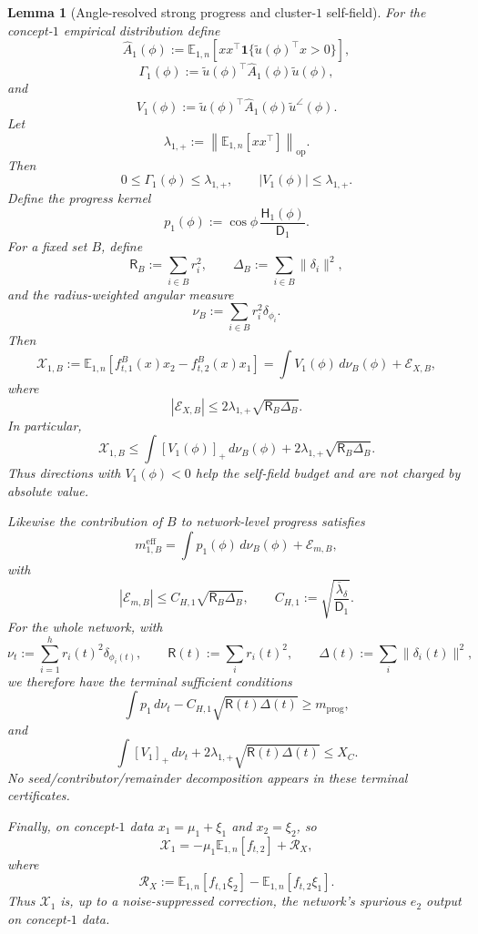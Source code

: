 \documentclass{article} %
\theoremstyle{plain}
\newtheorem{lemma}[theorem]{Lemma}
\theoremstyle{definition}
\theoremstyle{remark}
\begin{document}
\begin{lemma}[Angle-resolved strong progress and cluster-$1$ self-field]
\label{lem:angle-resolved-progress-self-field}
For the concept-$1$ empirical distribution define
\[
\widehat A_1(\phi)
:=
\mathbb E_{1,n}
\left[
xx^\top
\mathbf 1\{
\widetilde u(\phi)^\top x>0
\}
\right],
\]
\[
\Gamma_1(\phi)
:=
\widetilde u(\phi)^\top\widehat A_1(\phi)\widetilde u(\phi),
\]
and
\[
\boxed{
V_1(\phi)
:=
\widetilde u(\phi)^\top
\widehat A_1(\phi)
\widetilde u^\angle(\phi).
}
\]
Let
\[
\lambda_{1,+}
:=
\left\|
\mathbb E_{1,n}[xx^\top]
\right\|_{\mathrm{op}}.
\]
Then
\[
0\le\Gamma_1(\phi)\le\lambda_{1,+},
\qquad
|V_1(\phi)|\le\lambda_{1,+}.
\]
Define the progress kernel
\[
\boxed{
p_1(\phi)
:=
\cos\phi\,
\frac{\mathsf H_1(\phi)}{\mathsf D_1}.
}
\]
For a fixed set $B$, define
\[
\mathsf R_B:=\sum_{i\in B}r_i^2,
\qquad
\Delta_B:=\sum_{i\in B}\|\delta_i\|^2,
\]
and the radius-weighted angular measure
\[
\boxed{
\nu_B
:=
\sum_{i\in B}r_i^2\delta_{\phi_i}.
}
\]
Then
\[
\boxed{
\mathcal X_{1,B}
:=
\mathbb E_{1,n}
\left[
f_{t,1}^{B}(x)x_2-f_{t,2}^{B}(x)x_1
\right]
=
\int V_1(\phi)\,d\nu_B(\phi)
+
\mathcal E_{X,B},
}
\tag{X-measure}\label{eq:X-measure}
\]
where
\[
\boxed{
|\mathcal E_{X,B}|
\le
2\lambda_{1,+}
\sqrt{\mathsf R_B\Delta_B}.
}
\tag{X-measure-error}
\]
In particular,
\[
\boxed{
\mathcal X_{1,B}
\le
\int[V_1(\phi)]_+\,d\nu_B(\phi)
+
2\lambda_{1,+}\sqrt{\mathsf R_B\Delta_B}.
}
\tag{X-one-sided-measure}\label{eq:X-one-sided-measure}
\]
Thus directions with $V_1(\phi)<0$ help the self-field budget and are not
charged by absolute value.

Likewise the contribution of $B$ to network-level progress satisfies
\[
\boxed{
m_{1,B}^{\mathrm{eff}}
=
\int p_1(\phi)\,d\nu_B(\phi)
+
\mathcal E_{m,B},
}
\tag{m-measure}
\]
with
\[
\boxed{
|\mathcal E_{m,B}|
\le
C_{H,1}\sqrt{\mathsf R_B\Delta_B},
\qquad
C_{H,1}
:=
\sqrt{
\frac{\overline\lambda_\delta}{\mathsf D_1}
}.
}
\tag{m-measure-error}\label{eq:m-measure-error}
\]
For the whole network, with
\[
\nu_t:=\sum_{i=1}^h r_i(t)^2\delta_{\phi_i(t)},
\qquad
\mathsf R(t):=\sum_i r_i(t)^2,
\qquad
\Delta(t):=\sum_i\|\delta_i(t)\|^2,
\]
we therefore have the terminal sufficient conditions
\[
\boxed{
\int p_1\,d\nu_t
-
C_{H,1}\sqrt{\mathsf R(t)\Delta(t)}
\ge
m_{\mathrm{prog}},
}
\tag{terminal-progress-certificate}\label{eq:terminal-progress-certificate}
\]
and
\[
\boxed{
\int[V_1]_+\,d\nu_t
+
2\lambda_{1,+}\sqrt{\mathsf R(t)\Delta(t)}
\le
X_C.
}
\tag{terminal-self-field-certificate}\label{eq:terminal-self-field-certificate}
\]
No seed/contributor/remainder decomposition appears in these terminal
certificates.

Finally, on concept-$1$ data
$x_1=\mu_1+\xi_1$ and $x_2=\xi_2$, so
\[
\boxed{
\mathcal X_1
=
-\mu_1\mathbb E_{1,n}[f_{t,2}]
+
\mathcal R_X,
}
\]
where
\[
\mathcal R_X
:=
\mathbb E_{1,n}[f_{t,1}\xi_2]
-
\mathbb E_{1,n}[f_{t,2}\xi_1].
\]
Thus $\mathcal X_1$ is, up to a noise-suppressed correction, the network's
spurious $e_2$ output on concept-$1$ data.
\end{lemma}
\end{document}
